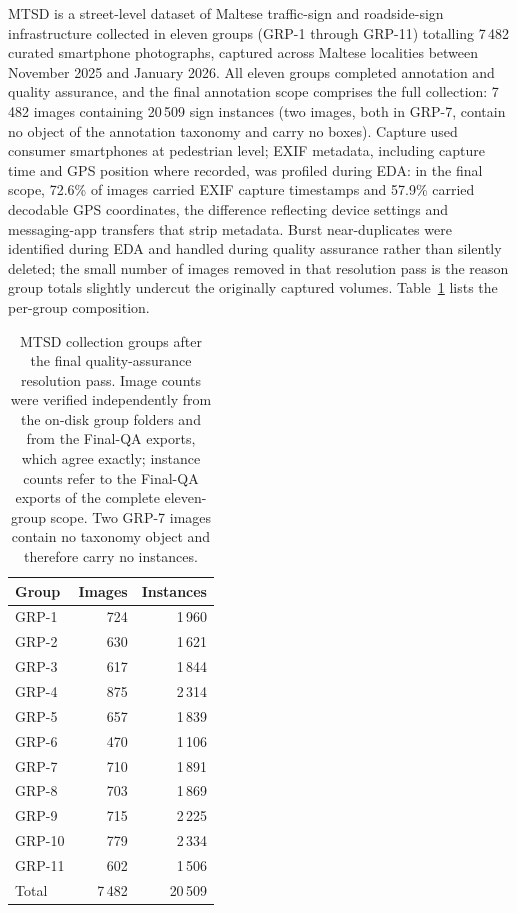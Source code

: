 MTSD is a street-level dataset of Maltese traffic-sign and roadside-sign infrastructure collected in eleven groups (GRP-1 through GRP-11) totalling 7\,482 curated smartphone photographs, captured across Maltese localities between November 2025 and January 2026. All eleven groups completed annotation and quality assurance, and the final annotation scope comprises the full collection: 7\,482 images containing 20\,509 sign instances (two images, both in GRP-7, contain no object of the annotation taxonomy and carry no boxes). Capture used consumer smartphones at pedestrian level; EXIF metadata, including capture time and GPS position where recorded, was profiled during EDA: in the final scope, 72.6\% of images carried EXIF capture timestamps and 57.9\% carried decodable GPS coordinates, the difference reflecting device settings and messaging-app transfers that strip metadata. Burst near-duplicates were identified during EDA and handled during quality assurance rather than silently deleted; the small number of images removed in that resolution pass is the reason group totals slightly undercut the originally captured volumes. Table~\ref{tab:mtsd-groups} lists the per-group composition.

\begin{table}[htbp]
\centering
\caption{MTSD collection groups after the final quality-assurance resolution pass. Image counts were verified independently from the on-disk group folders and from the Final-QA exports, which agree exactly; instance counts refer to the Final-QA exports of the complete eleven-group scope. Two GRP-7 images contain no taxonomy object and therefore carry no instances.}
\label{tab:mtsd-groups}
\small
\begin{tabular}{lrr}
\hline
\textbf{Group} & \textbf{Images} & \textbf{Instances} \\
\hline
GRP-1 & 724 & 1\,960 \\
GRP-2 & 630 & 1\,621 \\
GRP-3 & 617 & 1\,844 \\
GRP-4 & 875 & 2\,314 \\
GRP-5 & 657 & 1\,839 \\
GRP-6 & 470 & 1\,106 \\
GRP-7 & 710 & 1\,891 \\
GRP-8 & 703 & 1\,869 \\
GRP-9 & 715 & 2\,225 \\
GRP-10 & 779 & 2\,334 \\
GRP-11 & 602 & 1\,506 \\
\hline
Total & 7\,482 & 20\,509 \\
\hline
\end{tabular}
\end{table}

